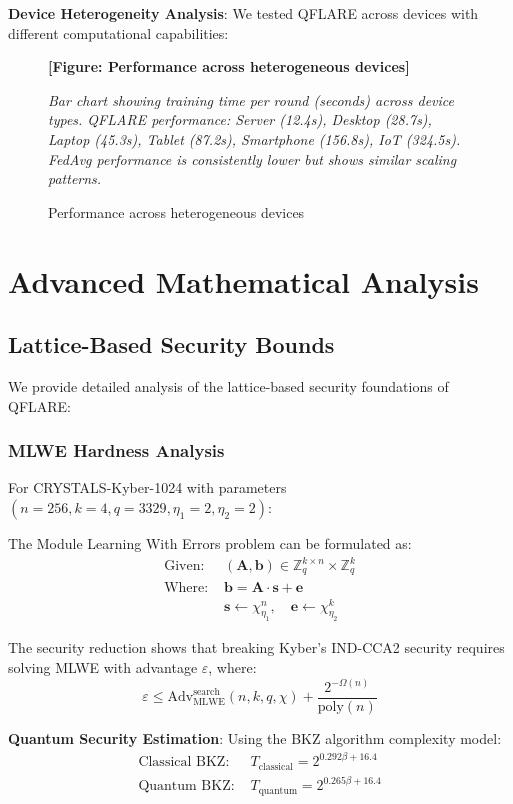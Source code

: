 \documentclass[journal]{IEEEtran}
\begin{document}
\textbf{Device Heterogeneity Analysis}:
We tested QFLARE across devices with different computational capabilities:

\begin{figure}[htbp]
\centering
\textbf{[Figure: Performance across heterogeneous devices]}

\textit{Bar chart showing training time per round (seconds) across device types. QFLARE performance: Server (12.4s), Desktop (28.7s), Laptop (45.3s), Tablet (87.2s), Smartphone (156.8s), IoT (324.5s). FedAvg performance is consistently lower but shows similar scaling patterns.}
\caption{Performance across heterogeneous devices}
\end{figure}

\section{Advanced Mathematical Analysis}

\subsection{Lattice-Based Security Bounds}

We provide detailed analysis of the lattice-based security foundations of QFLARE:

\subsubsection{MLWE Hardness Analysis}

For CRYSTALS-Kyber-1024 with parameters $(n=256, k=4, q=3329, \eta_1=2, \eta_2=2)$:

The Module Learning With Errors problem can be formulated as:
\begin{align}
\text{Given: } &(\mathbf{A}, \mathbf{b}) \in \mathbb{Z}_q^{k \times n} \times \mathbb{Z}_q^k \\
\text{Where: } &\mathbf{b} = \mathbf{A} \cdot \mathbf{s} + \mathbf{e} \\
&\mathbf{s} \leftarrow \chi_{\eta_1}^n, \quad \mathbf{e} \leftarrow \chi_{\eta_2}^k
\end{align}

The security reduction shows that breaking Kyber's IND-CCA2 security requires solving MLWE with advantage $\varepsilon$, where:
$$\varepsilon \leq \text{Adv}_{\text{MLWE}}^{\text{search}}(n, k, q, \chi) + \frac{2^{-\Omega(n)}}{\text{poly}(n)}$$

\textbf{Quantum Security Estimation}: Using the BKZ algorithm complexity model:
\begin{align}
\text{Classical BKZ: } &T_{\text{classical}} = 2^{0.292 \beta + 16.4} \\
\text{Quantum BKZ: } &T_{\text{quantum}} = 2^{0.265 \beta + 16.4}
\end{align}
\end{document}
